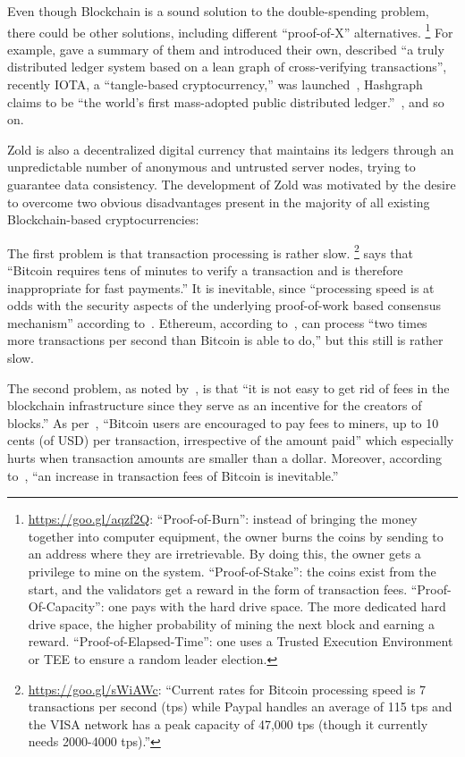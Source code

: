 \documentclass{main}
\begin{document}
Even though Blockchain is a sound solution to the double-spending
problem, there could be other solutions,
including different ``proof-of-X'' alternatives.%
\footnote{%
  \url{https://goo.gl/aqzf2Q}:
  ``Proof-of-Burn'': instead of bringing the money together into computer equipment,
  the owner burns the coins by sending to an address where they are
  irretrievable. By doing this, the owner gets a privilege to
  mine on the system.
  ``Proof-of-Stake'': the coins exist from the start, and
  the validators get a reward in the form of transaction fees.
  ``Proof-Of-Capacity'': one pays with the hard drive space. The more
  dedicated hard drive space, the higher probability of mining
  the next block and earning a reward.
  ``Proof-of-Elapsed-Time'': one uses a Trusted Execution Environment or TEE
  to ensure a random leader election.
}
For example, \textcite{everaere2010} gave
a summary of them and introduced their own,
\textcite{boyen2016} described
``a truly distributed ledger system based on a lean graph of cross-verifying transactions'',
recently IOTA, a ``tangle-based cryptocurrency,'' was launched~\parencite{popov2017},
Hashgraph claims
to be ``the world's first mass-adopted public distributed ledger.''~\parencite{hashgraph},
and so on.

Zold is also a decentralized digital currency that maintains its ledgers
through an unpredictable number of anonymous and untrusted server nodes, trying to guarantee
data consistency.
The development of Zold was motivated by the desire to overcome
two obvious disadvantages present in the majority of all existing
Blockchain-based cryptocurrencies:

The first problem is that transaction processing is rather slow.%
\footnote{%
  \url{https://goo.gl/sWiAWc}:
  ``Current rates for Bitcoin processing
  speed is 7 transactions per second (tps) while Paypal handles
  an average of 115 tps and the VISA
  network has a peak capacity of 47,000 tps (though it currently needs 2000-4000 tps).''
}
\textcite{karame2012} says that ``Bitcoin requires tens of minutes to verify a transaction
and is therefore inappropriate for fast payments.''
It is inevitable, since
``processing speed is at odds with the security aspects of the underlying
proof-of-work based consensus mechanism'' according to~\textcite{kiayias2015}.
Ethereum, according to~\textcite{fekkes2018}, can process
``two times more transactions per second than Bitcoin is able to do,''
but this still is rather slow.

The second problem, as noted by~\textcite{popov2017}, is that ``it is not easy to get rid
of fees in the blockchain infrastructure since they serve
as an incentive for the creators of blocks.''
As per~\textcite{moser2015}, ``Bitcoin users are encouraged to
pay fees to miners, up to 10 cents (of USD) per transaction, irrespective of the
amount paid'' which especially hurts when transaction amounts are smaller than a dollar.
Moreover, according to~\textcite{kaskaloglu2014},
``an increase in transaction fees of Bitcoin is inevitable.''
\end{document}
